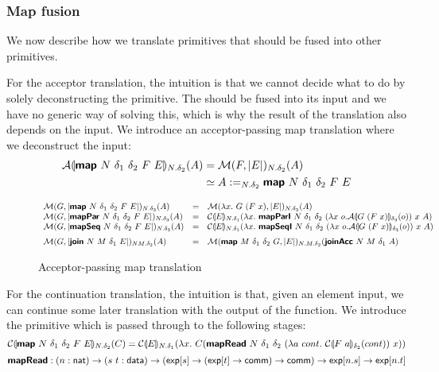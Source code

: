 \subsubsection{Map fusion} %

We now describe how we translate  primitives that should be fused into other primitives.

For the acceptor translation, the intuition is that we cannot decide what to do by solely deconstructing the  primitive. The  should be fused into its input and we have no generic way of solving this, which is why the result of the translation also depends on the input. We introduce an acceptor-passing map translation where we deconstruct the input:
\begin{align*}
\mathcal{A}\llparenthesis \bm{\mathsf{map}}~N~\delta_1~\delta_2~F~E \rrparenthesis_{N.\delta_2}(A)
&= \mathcal{M}(F, |E|)_{N.\delta_2}(A) \\
&\simeq A :=_{N.\delta_2} \bm{\mathsf{map}}~N~\delta_1~\delta_2~F~E
\end{align*}

\begin{figure}[H]
  \begin{displaymath}
    \begin{array}{lcl}
      \semM{G}{\prim{map}~N~\delta_1~\delta_2~F~E}_{N.\delta_3}(A)
      &=& \semM{\lambda x.~G~(F~x)}{E}_{N.\delta_3}(A) %
      \\
      \semM{G}{\prim{mapPar}~N~\delta_1~\delta_2~F~E}_{N.\delta_3}(A)
      &=& \semE{E}_{N.\delta_1}(\lambda x.~\prim{mapParI}~N~\delta_1~\delta_2~(\lambda x~o. \semA{G~(F~x)}_{\delta_3}(o))~x~A)
      \\
      \semM{G}{\prim{mapSeq}~N~\delta_1~\delta_2~F~E}_{N.\delta_3}(A)
      &=& \semE{E}_{N.\delta_1}(\lambda x.~\prim{mapSeqI}~N~\delta_1~\delta_2~(\lambda x~o. \semA{G~(F~x)}_{\delta_3}(o))~x~A)
      \medskip\\

      \semM{G}{\prim{join}~N~M~\delta_1~E}_{NM.\delta_2}(A)
      &=& \semM{\prim{map}~M~\delta_1~\delta_2~G}{E}_{N.M.\delta_2}(\prim{joinAcc}~N~M~\delta_1~A)
      \\
    \end{array}
  \end{displaymath}
  \caption{Acceptor-passing map translation}\label{fig:map-acc-trans}
\end{figure}

For the continuation translation, the intuition is that, given an element input, we can continue some later translation with the output of the function. We introduce the  primitive which is passed through to the following stages:
$$\mathcal{C}\llparenthesis \bm{\mathsf{map}}~N~\delta_1~\delta_2~F~E \rrparenthesis_{N.\delta_2}(C) = \mathcal{C}\llparenthesis E \rrparenthesis_{N.\delta_1}(\lambda x.~C(\bm{\mathsf{mapRead}}~N~\delta_1~\delta_2~(\lambda a~cont.~\mathcal{C}\llparenthesis F~a \rrparenthesis_{\delta_2}(cont))~x)) $$
$$ \bm{\mathsf{mapRead}}: (n : \mathsf{nat}) \to (s~t : \mathsf{data}) \to (\mathsf{exp}[s] \to (\mathsf{exp}[t] \to \mathsf{comm}) \to \mathsf{comm}) \to \mathsf{exp}[n.s] \to \mathsf{exp}[n.t] $$

